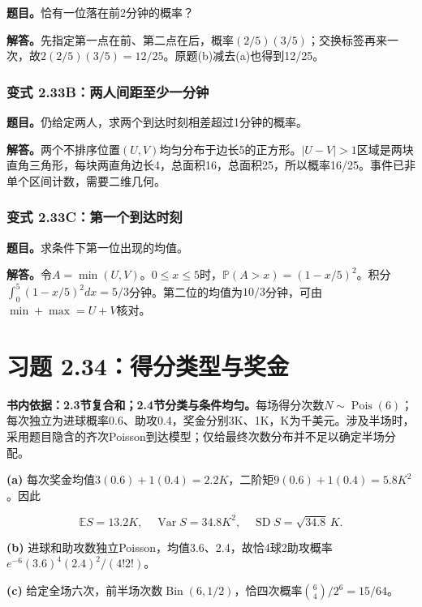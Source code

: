 \documentclass[12pt,a4paper,UTF8,fontset=fandol]{ctexart}
\begin{document}
\textbf{题目。}恰有一位落在前2分钟的概率？

\textbf{解答。}先指定第一点在前、第二点在后，概率\((2/5)(3/5)\)；交换标签再来一次，故\(2(2/5)(3/5)=12/25\)。原题(b)减去(a)也得到12/25。

\subsubsection{变式
2.33B：两人间距至少一分钟}\label{ux53d8ux5f0f-2.33bux4e24ux4ebaux95f4ux8dddux81f3ux5c11ux4e00ux5206ux949f}

\textbf{题目。}仍给定两人，求两个到达时刻相差超过1分钟的概率。

\textbf{解答。}两个不排序位置\((U,V)\)均匀分布于边长5的正方形。\(|U-V|>1\)区域是两块直角三角形，每块两直角边长4，总面积16，总面积25，所以概率16/25。事件已非单个区间计数，需要二维几何。

\subsubsection{变式
2.33C：第一个到达时刻}\label{ux53d8ux5f0f-2.33cux7b2cux4e00ux4e2aux5230ux8fbeux65f6ux523b}

\textbf{题目。}求条件下第一位出现的均值。

\textbf{解答。}令\(A=\min(U,V)\)。\(0\le x\le5\)时，\(\mathbb P(A>x)=(1-x/5)^2\)。积分\(\int_0^5(1-x/5)^2dx=5/3\)分钟。第二位的均值为\(10/3\)分钟，可由\(\min+\max=U+V\)核对。

\section{习题
2.34：得分类型与奖金}\label{ux4e60ux9898-2.34ux5f97ux5206ux7c7bux578bux4e0eux5956ux91d1}

\textbf{书内依据：2.3节复合和；2.4节分类与条件均匀。}每场得分次数\(N\sim\operatorname{Pois}(6)\)；每次独立为进球概率0.6、助攻0.4，奖金分别3K、1K，K为千美元。涉及半场时，采用题目隐含的齐次Poisson到达模型；仅给最终次数分布并不足以确定半场分配。

\textbf{(a)}
每次奖金均值\(3(0.6)+1(0.4)=2.2K\)，二阶矩\(9(0.6)+1(0.4)=5.8K^2\)。因此

\[\boxed{\mathbb ES=13.2K,\quad\operatorname{Var}S=34.8K^2,
\quad\operatorname{SD}S=\sqrt{34.8}\,K.}\]

\textbf{(b)}
进球和助攻数独立Poisson，均值3.6、2.4，故恰4球2助攻概率\(\boxed{e^{-6}(3.6)^4(2.4)^2/(4!2!)}\)。

\textbf{(c)}
给定全场六次，前半场次数\(\operatorname{Bin}(6,1/2)\)，恰四次概率\(\boxed{\binom64/2^6=15/64}\)。
\end{document}
